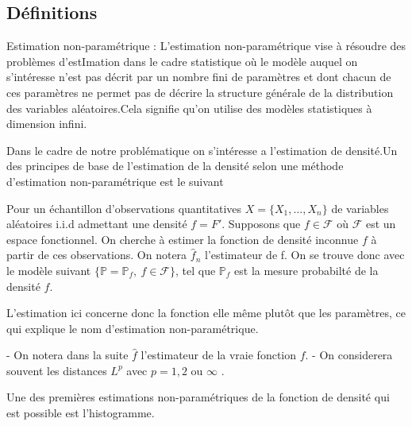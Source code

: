 \documentclass[
]{article}
\begin{document}
\subsection{Définitions}

\begin{definition}
    Estimation non-paramétrique :\newline
 L'estimation non-paramétrique vise à résoudre des problèmes d'estImation dans le cadre statistique où le modèle auquel on s'intéresse n'est pas décrit par un nombre fini de paramètres et dont chacun de ces paramètres ne permet pas de décrire la structure générale de la distribution des variables aléatoires.\newline Cela signifie qu'on utilise des modèles statistiques à dimension infini.
\end{definition}

Dans le cadre de notre problématique on s'intéresse a l'estimation de
densité.\newline Un des principes de base de l'estimation de la densité
selon une méthode d'estimation non-paramétrique est le suivant \newline

\begin{definition}
Pour un échantillon d'observations quantitatives $X=\{X_1, \dots,X_n\}$ de variables aléatoires i.i.d admettant une densité $f= F'$. Supposons que $f \in \mathcal F$ où $\mathcal{F}$ est un espace fonctionnel. On cherche à estimer la fonction de densité inconnue $f$ à partir de ces observations.\newline
On notera $\hat f_n$ l'estimateur de f.\newline
On se trouve donc avec le modèle suivant $\{\mathbb P=\mathbb P_f,~f \in \mathcal F\}$, 
tel que $\mathbb P_f$ est la mesure probabilté de la densité $f$.
\end{definition}

L'estimation ici concerne donc la fonction elle même plutôt que les
paramètres, ce qui explique le nom d'estimation
non-paramétrique.\newline

\begin{remark}  
- On notera dans la suite $\hat f$ l'estimateur de la vraie fonction $f$.  
- On considerera souvent les distances $L^p$ avec $p = 1,2$ ou $\infty$ .
\end{remark}

Une des premières estimations non-paramétriques de la fonction de
densité qui est possible est l'histogramme.
\end{document}
